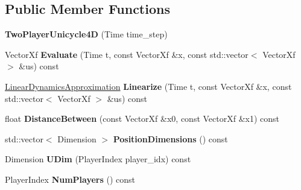 \subsection*{Public Member Functions}
\begin{DoxyCompactItemize}
\item 
{\bfseries Two\+Player\+Unicycle4D} (Time time\+\_\+step)\hypertarget{classilqgames_1_1_two_player_unicycle4_d_ab1e1f2b5c529f27727bd4b774db7396d}{}\label{classilqgames_1_1_two_player_unicycle4_d_ab1e1f2b5c529f27727bd4b774db7396d}

\item 
Vector\+Xf {\bfseries Evaluate} (Time t, const Vector\+Xf \&x, const std\+::vector$<$ Vector\+Xf $>$ \&us) const \hypertarget{classilqgames_1_1_two_player_unicycle4_d_abeb19eec56195a30c0ec726178d5a316}{}\label{classilqgames_1_1_two_player_unicycle4_d_abeb19eec56195a30c0ec726178d5a316}

\item 
\hyperlink{structilqgames_1_1_linear_dynamics_approximation}{Linear\+Dynamics\+Approximation} {\bfseries Linearize} (Time t, const Vector\+Xf \&x, const std\+::vector$<$ Vector\+Xf $>$ \&us) const \hypertarget{classilqgames_1_1_two_player_unicycle4_d_a07a9e89a52e8177dad08cccc80d343ae}{}\label{classilqgames_1_1_two_player_unicycle4_d_a07a9e89a52e8177dad08cccc80d343ae}

\item 
float {\bfseries Distance\+Between} (const Vector\+Xf \&x0, const Vector\+Xf \&x1) const \hypertarget{classilqgames_1_1_two_player_unicycle4_d_ac04d9ced33073d828df5cc91035b4854}{}\label{classilqgames_1_1_two_player_unicycle4_d_ac04d9ced33073d828df5cc91035b4854}

\item 
std\+::vector$<$ Dimension $>$ {\bfseries Position\+Dimensions} () const \hypertarget{classilqgames_1_1_two_player_unicycle4_d_abfd8456666e27e97b42fc7212522eab2}{}\label{classilqgames_1_1_two_player_unicycle4_d_abfd8456666e27e97b42fc7212522eab2}

\item 
Dimension {\bfseries U\+Dim} (Player\+Index player\+\_\+idx) const \hypertarget{classilqgames_1_1_two_player_unicycle4_d_ab669f54b874b51fd96ea28313d737131}{}\label{classilqgames_1_1_two_player_unicycle4_d_ab669f54b874b51fd96ea28313d737131}

\item 
Player\+Index {\bfseries Num\+Players} () const \hypertarget{classilqgames_1_1_two_player_unicycle4_d_ac2d8077da95177fc424cc49373c90c3a}{}\label{classilqgames_1_1_two_player_unicycle4_d_ac2d8077da95177fc424cc49373c90c3a}

\end{DoxyCompactItemize}
